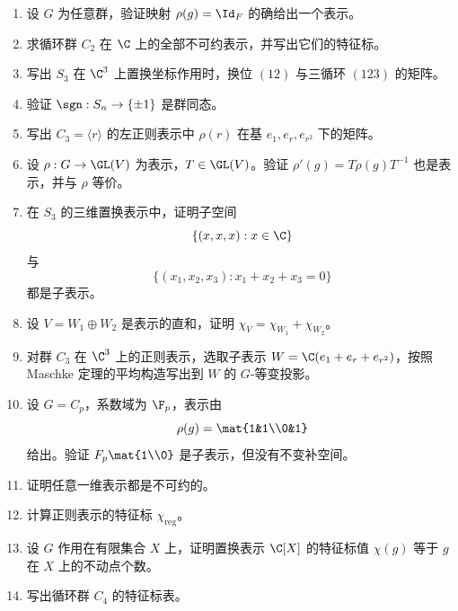 \begin{enumerate}[label={\textbf{习题8.\arabic*.}}, wide=0pt, leftmargin=3.2em]
\item \basic 设 $G$ 为任意群，验证映射 $\rho(g)=\Id_F$ 的确给出一个表示。

\item \basic 求循环群 $C_2$ 在 $\C$ 上的全部不可约表示，并写出它们的特征标。

\item \basic 写出 $S_3$ 在 $\C^3$ 上置换坐标作用时，换位 $(12)$ 与三循环 $(123)$ 的矩阵。

\item \basic 验证 $\sgn:S_n\to \{\pm 1\}$ 是群同态。

\item \basic 写出 $C_3=\langle r\rangle$ 的左正则表示中 $\rho(r)$ 在基 $e_1,e_r,e_{r^2}$ 下的矩阵。

\item \basic 设 $\rho:G\to \GL(V)$ 为表示，$T\in \GL(V)$。验证 $\rho'(g)=T\rho(g)T^{-1}$ 也是表示，并与 $\rho$ 等价。

\item \basic 在 $S_3$ 的三维置换表示中，证明子空间
\[
\{(x,x,x):x\in \C\}
\]
与
\[
\{(x_1,x_2,x_3):x_1+x_2+x_3=0\}
\]
都是子表示。

\item \basic 设 $V=W_1\oplus W_2$ 是表示的直和，证明 $\chi_V=\chi_{W_1}+\chi_{W_2}$。

\item \basic 对群 $C_3$ 在 $\C^3$ 上的正则表示，选取子表示 $W=\C(e_1+e_r+e_{r^2})$，按照 Maschke 定理的平均构造写出到 $W$ 的 $G$-等变投影。

\item \basic 设 $G=C_p$，系数域为 $\F_p$，表示由
\[
\rho(g)=\mat{1&1\\0&1}
\]
给出。验证 $F_p\mat{1\\0}$ 是子表示，但没有不变补空间。

\item \basic 证明任意一维表示都是不可约的。

\item \basic 计算正则表示的特征标 $\chi_{\mathrm{reg}}$。

\item \basic 设 $G$ 作用在有限集合 $X$ 上，证明置换表示 $\C[X]$ 的特征标值 $\chi(g)$ 等于 $g$ 在 $X$ 上的不动点个数。

\item \basic 写出循环群 $C_4$ 的特征标表。


\end{enumerate}
